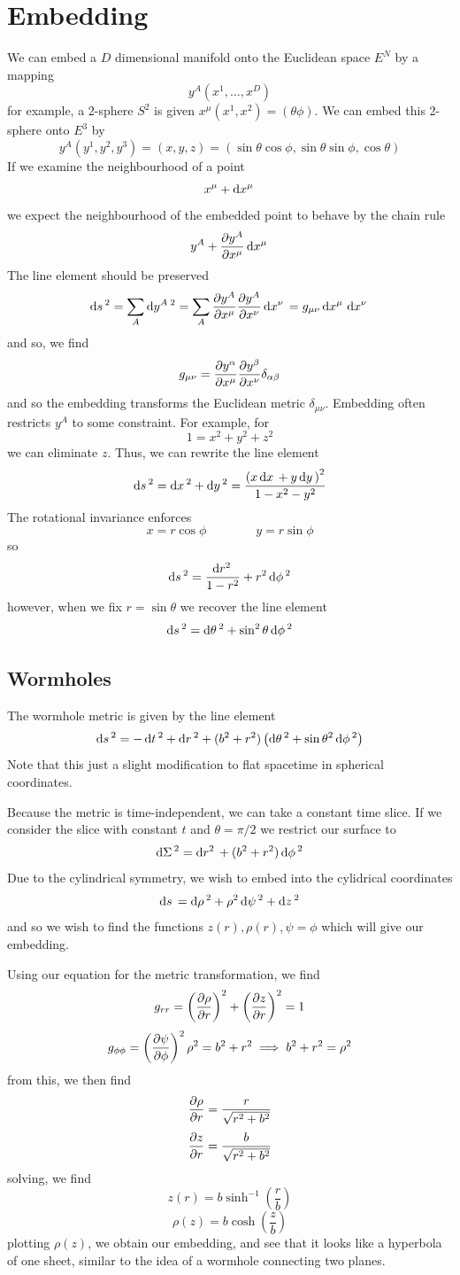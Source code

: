 \section{Embedding}
We can embed a \(D\) dimensional manifold onto the Euclidean space \(E^N\) by a mapping
\[y^A(x^1,\ldots, x^D)\]
for example, a 2-sphere \(S^2\) is given \(x^\mu(x^1,x^2) = (\theta\phi)\). We can embed this 2-sphere onto \(E^3\) by
\[y^A(y^1, y^2, y^3) = (x,y,z) = (\sin\theta\cos\phi,\sin\theta\sin\phi, \cos\theta)\]
If we examine the neighbourhood of a point
\[x^\mu+\d{x^\mu}\]
we expect the neighbourhood of the embedded point to behave by the chain rule
\[y^A + \pder{y^A}{x^\mu}\d{x^\mu}\]
The line element should be preserved
\[\d{s}^2 = \sum_{A}\d{y^A}^2 = \sum_{A}\pder{y^A}{x^\mu}\pder{y^A}{x^\nu}\d{x^\nu} = g_{\mu\nu}\d{x^\mu}\d{x^\nu}\]
and so, we find 
\[g_{\mu\nu} = \frac{\partial y^\alpha}{\partial x^\mu}\frac{\partial y^\beta}{\partial x^\nu}\delta_{\alpha\beta}\]
and so the embedding transforms the Euclidean metric \(\delta_{\mu\nu}\).
Embedding often restricts \(y^A\) to some constraint. For example, for
\[1 = x^2+y^2+z^2\]
we can eliminate \(z\). Thus, we can rewrite the line element
\[\d{s}^2 = \d{x}^2 + \d{y}^2 = \frac{\left(x\d{x} + y\d{y}\right)^2}{1-x^2-y^2}\]
The rotational invariance enforces
\[x = r\cos\phi\qquad\qquad y = r\sin\phi\]
so
\[\d{s}^2 = \frac{\d{r^2}}{1-r^2} + r^2\d\phi^2\]
however, when we fix \(r = \sin\theta\) we recover the line element
\[\d{s}^2 = \d{\theta}^2 + \sin^2\theta\d\phi^2\]

\subsection{Wormholes}
The wormhole metric is given by the line element
\begin{equation}
	\d{s}^2 = -\d{t}^2 + \d{r}^2 + (b^2+r^2)\left(\d\theta^2 + \sin\theta^2\d\phi^2\right)
\end{equation}
Note that this just a slight modification to flat spacetime in spherical coordinates.

Because the metric is time-independent, we can take a constant time slice. If we consider the slice with constant \(t\) and \(\theta = \pi/2\) we restrict our surface to
\[\d\Sigma^2 = \d{r^2} + (b^2+r^2)\d\phi^2\]
Due to the cylindrical symmetry, we wish to embed into the cylidrical coordinates
\[\d{s}=\d\rho^2 + \rho^2\d\psi^2 + \d z^2\]
and so we wish to find the functions \(z(r), \rho(r), \psi = \phi\) which will give our embedding.

Using our equation for the metric transformation, we find
\[g_{rr} = \left(\frac{\partial \rho}{\partial r}\right)^2 +\left(\frac{\partial z}{\partial r}\right)^2 = 1\]
\[g_{\phi\phi} = \left(\frac{\partial \psi}{\partial \phi}\right)^2\rho^2=b^2+r^2\implies b^2+r^2 = \rho^2\]
from this, we then find
\[\frac{\partial \rho}{\partial r} = \frac{r}{\sqrt{r^2+b^2}}\]
\[\frac{\partial z}{\partial r}= \frac{b}{\sqrt{r^2+b^2}}\]
solving, we find
\[z(r) = b\sinh^{-1}\left(\frac{r}{b}\right)\]
\[\rho(z) = b\cosh\left(\frac{z}{b}\right)\]
plotting \(\rho(z)\), we obtain our embedding, and see that it looks like a hyperbola of one sheet, similar to the idea of a wormhole connecting two planes.

